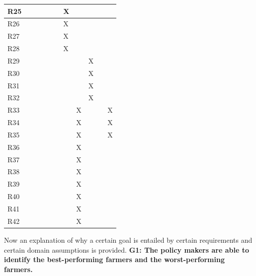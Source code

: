\documentclass{article}
\begin{document}
\begin{longtable}[c]{|m{0.15cm}|m{0.15cm}|m{0.15cm}|m{0.15cm}|m{0.15cm}|m{0.15cm}|m{0.15cm}|m{0.15cm}|m{0.15cm}|m{0.15cm}|m{0.15cm}|}
 \hline
 R25 &   &   &   &   &   & X &   &   &   &   \\
 \hline
 R26 &   &   &   &   &   & X &   &   &   &   \\
 \hline
 R27 &   &   &   &   &   & X &   &   &   &   \\
 \hline
 R28 &   &   &   &   &   & X &   &   &   &   \\
 \hline
 R29 &   &   &   &   &   &   &   & X &   &   \\
 \hline
 R30 &   &   &   &   &   &   &   & X &   &   \\
 \hline
 R31 &   &   &   &   &   &   &   & X &   &   \\
 \hline
 R32 &   &   &   &   &   &   &   & X &   &   \\
 \hline
 R33 &   &   &   &   &   &   & X &   &   & X \\
 \hline
 R34 &   &   &   &   &   &   & X &   &   & X \\
 \hline
 R35 &   &   &   &   &   &   & X &   &   & X \\
 \hline
 R36 &   &   &   &   &   &   & X &   &   &   \\
 \hline
 R37 &   &   &   &   &   &   & X &   &   &   \\
 \hline
 R38 &   &   &   &   &   &   & X &   &   &   \\
 \hline
 R39 &   &   &   &   &   &   & X &   &   &   \\
 \hline
 R40 &   &   &   &   &   &   & X &   &   &   \\
 \hline
 R41 &   &   &   &   &   &   & X &   &   &   \\
 \hline
 R42 &   &   &   &   &   &   & X &   &   &   \\
 \hline
\end{longtable}
Now an explanation of why a certain goal is entailed by certain requirements and certain domain assumptions is provided.
\vspace{1cm}
\newline
\textbf{G1: The policy makers are able to identify the best-performing farmers and the worst-performing farmers.}
\end{document}
